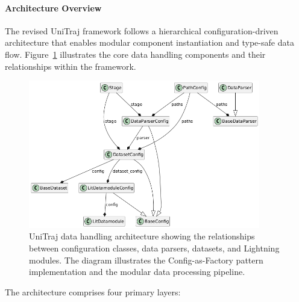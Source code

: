 \paragraph{Architecture Overview}
The revised UniTraj framework follows a hierarchical configuration-driven architecture that enables modular component instantiation and type-safe data flow. Figure~\ref{fig:unitraj_data_architecture} illustrates the core data handling components and their relationships within the framework.

\begin{figure}[htbp]
    \centering
    \includegraphics[width=0.9\textwidth]{figures/classes_DataHandling.png}
    \caption{UniTraj data handling architecture showing the relationships between configuration classes, data parsers, datasets, and Lightning modules. The diagram illustrates the Config-as-Factory pattern implementation and the modular data processing pipeline.}
    \label{fig:unitraj_data_architecture}
\end{figure}

The architecture comprises four primary layers:

